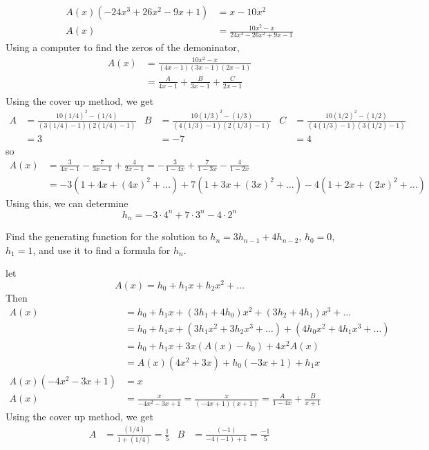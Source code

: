 \documentclass[12pt]{article}
\newenvironment{exercise}[2][Exercise]{\begin{trivlist}
\item[\hskip \labelsep {\bfseries #1} \hskip \labelsep {\bfseries #2.}]}{\end{trivlist}}
\begin{document}
\begin{align*}
	A(x)(-24x^3 + 26x^2 - 9x + 1) &= x - 10x^2 \\
	A(x) &= \frac{10x^2 - x}{24x^3 - 26x^2 + 9x - 1}
\end{align*}
Using a computer to find the zeros of the demoninator,
\begin{align*}
	A(x) &= \frac{10x^2 - x}{(4x - 1)(3x - 1)(2x - 1)} \\
	     &= \frac{A}{4x - 1} + \frac{B}{3x - 1} + \frac{C}{2x - 1} \\
\end{align*}
Using the cover up method, we get
\begin{align*}
	A &= \frac{10(1/4)^2 - (1/4)}{(3(1/4) - 1)(2(1/4) - 1)} & B &= \frac{10(1/3)^2 - (1/3)}{(4(1/3) - 1)(2(1/3) - 1)} & C &= \frac{10(1/2)^2 - (1/2)}{(4(1/3) - 1)(3(1/2) - 1)} \\
	  &= 3 & &= -7 & &= 4
\end{align*}
so
\begin{align*}
	A(x) &= \frac{3}{4x - 1} - \frac{7}{3x - 1} + \frac{4}{2x - 1} = -\frac{3}{1 - 4x} + \frac{7}{1 - 3x} - \frac{4}{1 - 2x}\\
	     &= -3(1 + 4x + (4x)^2 + \ldots) + 7(1 + 3x + (3x)^2 + \ldots) -4(1 + 2x + (2x)^2 + \ldots)
\end{align*}
Using this, we can determine
\[
	h_n = -3\cdot4^n + 7\cdot3^n -4 \cdot 2^n
\]
\begin{exercise}{3.4.7 (2pt)}
	Find the generating function for the solution to $h_n = 3h_{n-1} + 4h_{n-2}$, $h_0 = 0$, $h_1 = 1$, and use it to find a formula for $h_n$.
\end{exercise}	
let 
\[
	A(x) = h_0 + h_1x + h_2x^2 + \ldots
\]
Then
\begin{align*}
	A(x) &= h_0 + h_1x + (3h_1 + 4h_0)x^2 + (3h_2 + 4h_1)x^3 + \ldots \\
	     &= h_0 + h_1x + (3h_1x^2 + 3h_2x^3 + \ldots) + (4h_0x^2 + 4h_1x^3 + \ldots) \\
	     &= h_0 + h_1x + 3x(A(x) - h_0) + 4x^2A(x) \\
	     &= A(x)(4x^2 + 3x) + h_0(-3x + 1) + h_1x \\
	A(x)(-4x^2 -3x + 1) &= x \\
	A(x) &= \frac{x}{-4x^2 - 3x + 1} = \frac{x}{(-4x + 1)(x + 1)} = \frac{A}{1 - 4x} + \frac{B}{x + 1}
\end{align*}
Using the cover up method, we get
\begin{align*}
	A &= \frac{(1/4)}{1 + (1/4)} = \frac{1}{5} & B &= \frac{(-1)}{-4(-1) + 1} = \frac{-1}{5}
\end{align*}
\end{document}
